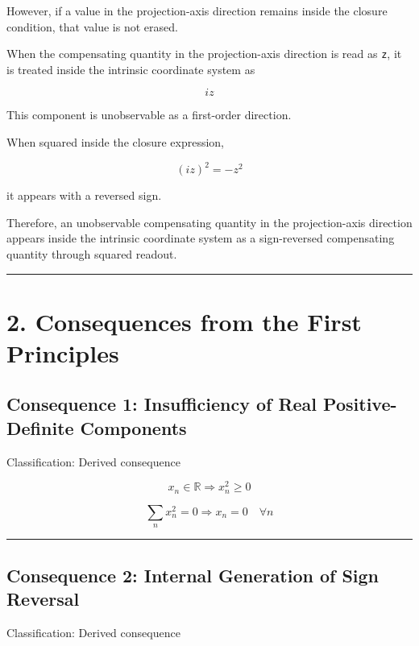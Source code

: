 \documentclass[
  a4paper,
]{article}
\begin{document}
However, if a value in the projection-axis direction remains inside the
closure condition, that value is not erased.

When the compensating quantity in the projection-axis direction is read
as \texttt{z}, it is treated inside the intrinsic coordinate system as

\[
iz
\]

This component is unobservable as a first-order direction.

When squared inside the closure expression,

\[
(iz)^2=-z^2
\]

it appears with a reversed sign.

Therefore, an unobservable compensating quantity in the projection-axis
direction appears inside the intrinsic coordinate system as a
sign-reversed compensating quantity through squared readout.

\begin{center}\rule{0.5\linewidth}{0.5pt}\end{center}

\section{2. Consequences from the First
Principles}\label{consequences-from-the-first-principles}

\subsection{Consequence 1: Insufficiency of Real Positive-Definite
Components}\label{consequence-1-insufficiency-of-real-positive-definite-components}

Classification: Derived consequence

\[
x_n\in\mathbb{R}
\Rightarrow
x_n^2\ge0
\]

\[
\sum_n x_n^2=0
\Rightarrow
x_n=0\quad\forall n
\]

\begin{center}\rule{0.5\linewidth}{0.5pt}\end{center}

\subsection{Consequence 2: Internal Generation of Sign
Reversal}\label{consequence-2-internal-generation-of-sign-reversal}

Classification: Derived consequence
\end{document}
